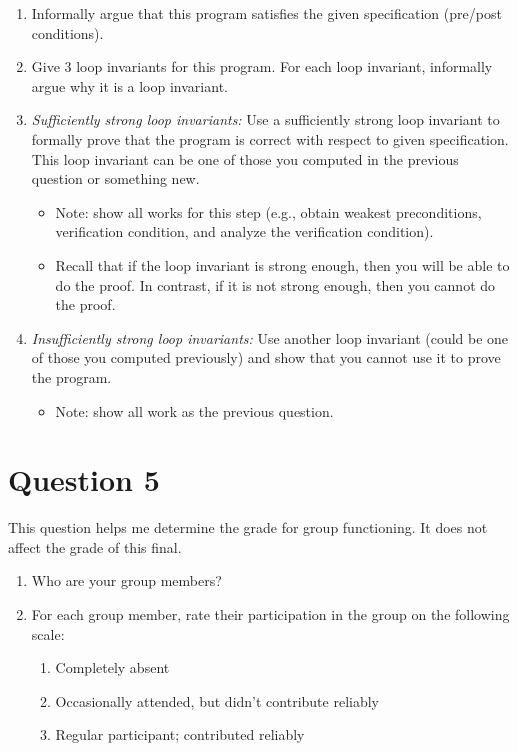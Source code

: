 \documentclass[10pt]{article}
\begin{document}
\begin{enumerate}
\item Informally argue that this program satisfies the given specification (pre/post conditions).
\item Give 3 loop invariants for this program. For each loop invariant, informally argue why it is a loop invariant.  
\item \emph{Sufficiently strong loop invariants:}  Use a sufficiently strong loop invariant to formally prove that the program is correct with respect to given specification. This loop invariant can be one of those you computed in the previous question or something new.
  \begin{itemize}
    \item Note: show all works for this step (e.g., obtain weakest preconditions, verification condition, and analyze the verification condition).
  \item Recall that if the loop invariant is strong enough, then you will be able to do the proof. In contrast, if it is not strong enough, then you cannot do the proof.
  \end{itemize}
\item \emph{Insufficiently strong loop invariants:} Use another loop invariant (could be one of those you computed previously) and show that you cannot use it to prove the program. 
  \begin{itemize}
    \item Note: show all work as the previous question.
  \end{itemize}
\end{enumerate}


\newpage
\section{Question 5}

This question helps me determine the grade for group functioning.  It does not affect the grade of this final.

\begin{enumerate}
\item Who are your group members?
\item For each group member, rate their participation in the group on the following scale:
  \begin{enumerate}
  \item Completely absent
  \item Occasionally attended, but didn't contribute reliably
  \item Regular participant; contributed reliably
  \end{enumerate}
\end{enumerate}
\end{document}
